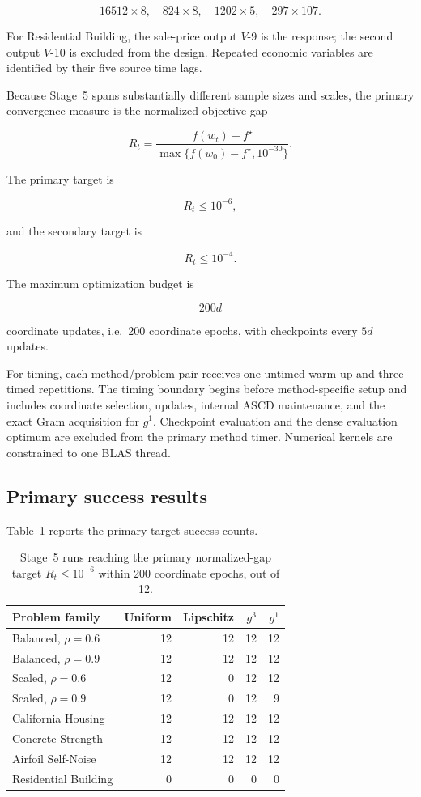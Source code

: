 \documentclass[11pt]{article}
\begin{document}
\[
16512\times 8,\quad
824\times 8,\quad
1202\times 5,\quad
297\times 107.
\]

For Residential Building, the sale-price output $V$-9 is the response;
the second output $V$-10 is excluded from the design. Repeated economic
variables are identified by their five source time lags.

Because Stage~5 spans substantially different sample sizes and scales,
the primary convergence measure is the normalized objective gap

\begin{equation}
R_t
=
\frac{f(w_t)-f^\star}
{\max\{f(w_0)-f^\star,10^{-30}\}}.
\label{eq:relative-gap}
\end{equation}

The primary target is

\[
R_t\le10^{-6},
\]

and the secondary target is

\[
R_t\le10^{-4}.
\]

The maximum optimization budget is

\[
200d
\]

coordinate updates, i.e.\ 200 coordinate epochs, with checkpoints every
$5d$ updates.

For timing, each method/problem pair receives one untimed warm-up and
three timed repetitions. The timing boundary begins before
method-specific setup and includes coordinate selection, updates,
internal ASCD maintenance, and the exact Gram acquisition for $g^1$.
Checkpoint evaluation and the dense evaluation optimum are excluded from
the primary method timer. Numerical kernels are constrained to one BLAS
thread.


\subsection{Primary success results}

Table~\ref{tab:stage5-success} reports the primary-target success counts.

\begin{table}[!htbp]
\centering
\caption{
Stage~5 runs reaching the primary normalized-gap target
$R_t\le10^{-6}$ within 200 coordinate epochs, out of 12.
}
\label{tab:stage5-success}
\small
\begin{tabular}{lrrrr}
\toprule
Problem family
& Uniform
& Lipschitz
& $g^3$
& $g^1$ \\
\midrule
Balanced, $\rho=0.6$ & 12 & 12 & 12 & 12 \\
Balanced, $\rho=0.9$ & 12 & 12 & 12 & 12 \\
Scaled, $\rho=0.6$   & 12 &  0 & 12 & 12 \\
Scaled, $\rho=0.9$   & 12 &  0 & 12 &  9 \\
California Housing   & 12 & 12 & 12 & 12 \\
Concrete Strength    & 12 & 12 & 12 & 12 \\
Airfoil Self-Noise   & 12 & 12 & 12 & 12 \\
Residential Building &  0 &  0 &  0 &  0 \\
\bottomrule
\end{tabular}
\end{table}
\end{document}
